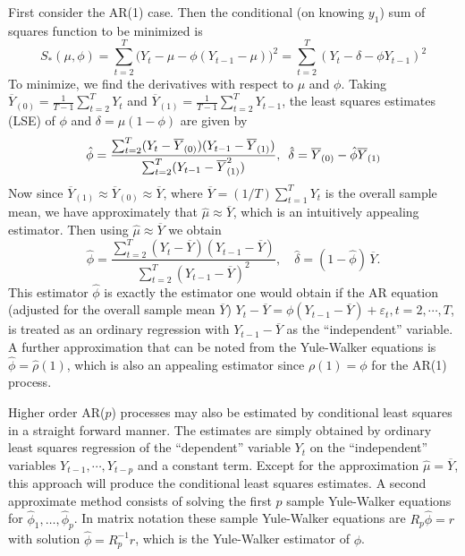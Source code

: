 First consider the AR(1) case. Then the conditional (on knowing $y_1$) sum of squares function to be minimized is
	\[
	S_*(\mu,\phi) = \sum_{t=2}^T \big(Y_t - \mu - \phi(Y_{t-1} - \mu) \big)^2 = \sum_{t=2}^T (Y_t - \delta - \phi Y_{t-1})^2
	\]
To minimize, we find the derivatives with respect to $\mu$ and $\phi$. Taking $\overline{Y}_{(0)} = \frac{1}{T-1} \sum_{t=2}^T Y_t$ and $\overline{Y}_{(1)} = \frac{1}{T-1} \sum_{t=2}^T Y_{t-1}$, the least squares estimates (LSE) of $\phi$ and $\delta = \mu(1 - \phi)$ are given by
	\[
	\hat{\phi} = \dfrac{\sum_{t=2}^T(Y_t - \overline{Y}_{(0)})(Y_{t-1} - \overline{Y}_{(1)})}{\sum_{t=2}^T(Y_{t-1} - \overline{Y}_{(1)}^2)} ,  \enskip \hat{\delta} = \overline{Y}_{(0)} - \hat{\phi}\overline{Y}_{(1)}
	\]
Now since $\overline{Y}_{(1)} \approx \overline{Y}_{(0)} \approx \overline{Y}$, where $\overline{Y} = (1/T)\sum_{t=1}^T Y_t$ is the overall sample mean, we have approximately that $\hat{\mu} \approx \overline{Y}$, which is an intuitively appealing estimator. Then using $\hat{\mu} \approx \overline{Y}$ we obtain
	\begin{equation}\label{eqn:anotherhatphi}
	\hat{\phi} = \frac{\sum_{t=2}^T(Y_t - \overline{Y})(Y_{t-1} - \overline{Y})}{\sum_{t=2}^T(Y_{t-1} - \overline{Y})^2}, \quad \hat{\delta}= (1-\hat{\phi}) \, \overline{Y}.
	\end{equation}
This estimator $\hat{\phi}$ is exactly the estimator one would obtain if the AR equation (adjusted for the overall sample mean $\overline{Y}$) $Y_t - \overline{Y} = \phi(Y_{t-1} - \overline{Y}) + \varepsilon_t, t = 2,\cdots,T$, is treated as an ordinary regression with $Y_{t-1} - \overline{Y}$ as the ``independent'' variable. A further approximation that can be noted from the Yule-Walker equations is $\hat{\phi}=\hat{\rho}(1)$, which is also an appealing estimator since $\rho(1) = \phi$ for the AR(1) process. 


Higher order AR($p$) processes may also be estimated by conditional least squares in a straight forward manner. The estimates are simply obtained by ordinary least squares regression of the ``dependent'' variable $Y_t$ on the ``independent'' variables $Y_{t-1},\cdots,Y_{t-p}$ and a constant term. Except for the approximation $\hat{\mu} = \overline{Y}$, this approach will produce the conditional least squares estimates. A second approximate method consists of solving the first $p$ sample Yule-Walker equations for $\hat{\phi}_1,\ldots,\hat{\phi}_p$. In matrix notation these sample Yule-Walker equations are $R_p\hat{\phi} = r$ with solution $\hat{\phi} = R_p^{-1}r$, which is the Yule-Walker estimator of $\phi$.


